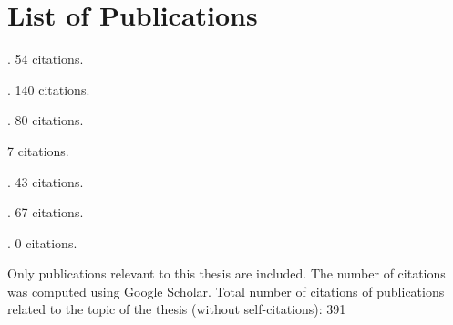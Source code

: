 \chapter*{List of Publications}

\small
{}


\noindent{}. 54 citations.
\vspace{4mm}

\noindent{}. 140 citations.
\vspace{4mm}

\noindent{}. 80 citations.
\vspace{4mm}

\noindent{} 7 citations.
\vspace{4mm}

\noindent{}. 43 citations.
\vspace{4mm}

\noindent{}. 67 citations.
\vspace{4mm}

\noindent{}. 0 citations.

\vfill
\normalsize

\noindent Only publications relevant to this thesis are included. The number of
citations was computed using Google Scholar. Total number of citations of
publications related to the topic of the thesis (without self-citations):
{\large 391} %



